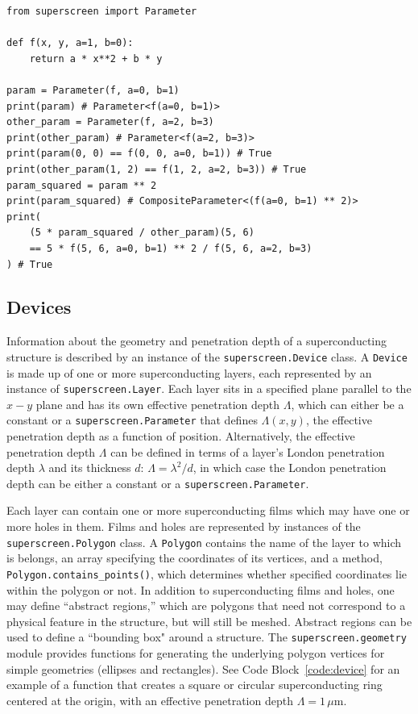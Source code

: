 \documentclass[final,3p,times]{elsarticle}
\newcommand{\inline}[1]{\texttt{#1}\xspace}
\newenvironment{code}{\captionsetup{type=listing}}{\hfill}
\begin{document}
\begin{code}
\begin{verbatim}
from superscreen import Parameter

def f(x, y, a=1, b=0):
    return a * x**2 + b * y
    
param = Parameter(f, a=0, b=1)
print(param) # Parameter<f(a=0, b=1)>
other_param = Parameter(f, a=2, b=3)
print(other_param) # Parameter<f(a=2, b=3)>
print(param(0, 0) == f(0, 0, a=0, b=1)) # True
print(other_param(1, 2) == f(1, 2, a=2, b=3)) # True
param_squared = param ** 2
print(param_squared) # CompositeParameter<(f(a=0, b=1) ** 2)>
print(
    (5 * param_squared / other_param)(5, 6)
    == 5 * f(5, 6, a=0, b=1) ** 2 / f(5, 6, a=2, b=3)
) # True
\end{verbatim}
\captionof{listing}{The basic usage of \inline{superscreen.Parameters}.}
\label{code:parameters}
\end{code}

\subsection{Devices}
\label{section:overview:device}

Information about the geometry and penetration depth of a superconducting structure is described by an instance of the \inline{superscreen.Device} class. A \inline{Device} is made up of one or more superconducting layers, each represented by an instance of  \inline{superscreen.Layer}. Each layer sits in a specified plane parallel to the $x-y$ plane and has its own effective penetration depth $\Lambda$, which can either be a constant or a \inline{superscreen.Parameter} that defines $\Lambda(x, y)$, the effective penetration depth as a function of position. Alternatively, the effective penetration depth $\Lambda$ can be defined in terms of a layer's London penetration depth $\lambda$ and its thickness $d$: $\Lambda=\lambda^2/d$, in which case the London penetration depth can be either a constant or a \inline{superscreen.Parameter}.

Each layer can contain one or more superconducting films which may have one or more holes in them. Films and holes are represented by instances of the \inline{superscreen.Polygon} class. A \inline{Polygon} contains the name of the layer to which is belongs, an array specifying the coordinates of its vertices, and a method, \inline{Polygon.contains_points()}, which determines whether specified coordinates lie within the polygon or not. In addition to superconducting films and holes, one may define ``abstract regions,'' which are polygons that need not correspond to a physical feature in the structure, but will still be meshed. Abstract regions can be used to define a ``bounding box" around a structure. The \inline{superscreen.geometry} module provides functions for generating the underlying polygon vertices for simple geometries (ellipses and rectangles). See Code Block~\ref{code:device} for an example of a function that creates a square or circular superconducting ring centered at the origin, with an effective penetration depth $\Lambda = 1\,\mu\mathrm{m}$.
\end{document}
